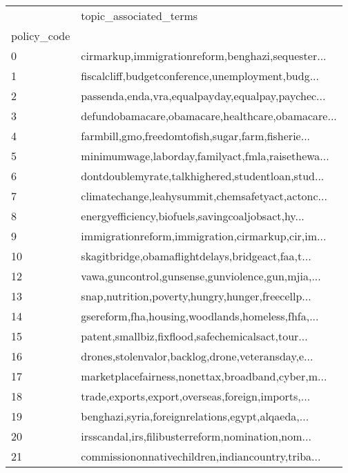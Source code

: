 \begin{tabular}{ll}
\toprule
{} &                             topic\_associated\_terms \\
policy\_code &                                                    \\
\midrule
0           &  cirmarkup,immigrationreform,benghazi,sequester... \\
1           &  fiscalcliff,budgetconference,unemployment,budg... \\
2           &  passenda,enda,vra,equalpayday,equalpay,paychec... \\
3           &  defundobamacare,obamacare,healthcare,obamacare... \\
4           &  farmbill,gmo,freedomtofish,sugar,farm,fisherie... \\
5           &  minimumwage,laborday,familyact,fmla,raisethewa... \\
6           &  dontdoublemyrate,talkhighered,studentloan,stud... \\
7           &  climatechange,leahysummit,chemsafetyact,actonc... \\
8           &  energyefficiency,biofuels,savingcoaljobsact,hy... \\
9           &  immigrationreform,immigration,cirmarkup,cir,im... \\
10          &  skagitbridge,obamaflightdelays,bridgeact,faa,t... \\
12          &  vawa,guncontrol,gunsense,gunviolence,gun,mjia,... \\
13          &  snap,nutrition,poverty,hungry,hunger,freecellp... \\
14          &  gsereform,fha,housing,woodlands,homeless,fhfa,... \\
15          &  patent,smallbiz,fixflood,safechemicalsact,tour... \\
16          &  drones,stolenvalor,backlog,drone,veteransday,e... \\
17          &  marketplacefairness,nonettax,broadband,cyber,m... \\
18          &  trade,exports,export,overseas,foreign,imports,... \\
19          &  benghazi,syria,foreignrelations,egypt,alqaeda,... \\
20          &  irsscandal,irs,filibusterreform,nomination,nom... \\
21          &  commissiononnativechildren,indiancountry,triba... \\
\bottomrule
\end{tabular}
